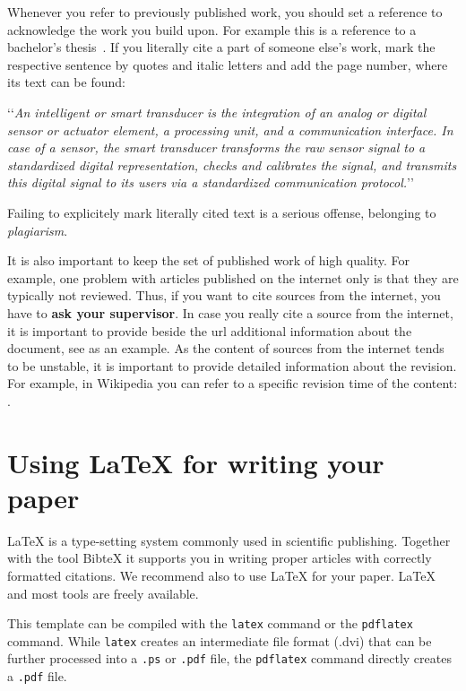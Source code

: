 \documentclass[10pt,a4paper,twoside,twocolumn]{article}
\def\lqq{\lq\lq}
\def\rqq{\rq\rq}
\def\zitat#1{\lqq \emph{#1}\rqq}
\begin{document}
Whenever you refer to previously published work, you should set a
reference to acknowledge the work you build upon. For example this
is a reference to a bachelor's thesis~\cite{kraut:2003}. If you
literally cite a part of someone else's work, mark the respective
sentence by quotes and italic letters and add the page number, where
its text can be found:

\zitat{An intelligent or {\em smart} transducer is the integration
of an analog or digital sensor or actuator element, a processing
unit, and a communication interface. In case of a sensor, the smart
transducer transforms the raw sensor signal to a standardized
digital representation, checks and calibrates the signal, and
transmits this digital signal to its users via a standardized
communication protocol.} \cite[p.\,175]{elmenreich:2005}

Failing to explicitely mark literally cited text is a serious offense,
belonging to {\em plagiarism}.

It is also important to keep the set of published work of high quality.
For example, one problem with articles published on the internet only
is that they are typically not reviewed.
Thus, if you want to cite sources from the internet, you have to
{\bfseries ask your supervisor}.
In case you really cite a source from the internet, it is important
to provide beside the url additional information about the document,
see \cite{juergens:latexeinf} as an example.
As the content of sources from the internet tends to be unstable, it
is important to provide detailed information about the revision.
For example, in Wikipedia you can refer to a specific revision time
of the content: \cite{wikipedia:wcet}.

\section{Using {\LaTeX} for writing your paper\label{sec:latex}}

{\LaTeX} is a type-setting system commonly used in scientific
publishing. Together with the tool BibteX it supports you in writing
proper articles with correctly formatted citations. We recommend
also to use {\LaTeX} for your paper. {\LaTeX} and most tools are
freely available.

This template can be compiled with the \texttt{latex} command or the
\texttt{pdflatex} command. While \texttt{latex} creates an
intermediate file format (.dvi) that can be further processed into a
\texttt{.ps} or \texttt{.pdf} file, the \texttt{pdflatex} command
directly creates a \texttt{.pdf} file.
\end{document}
